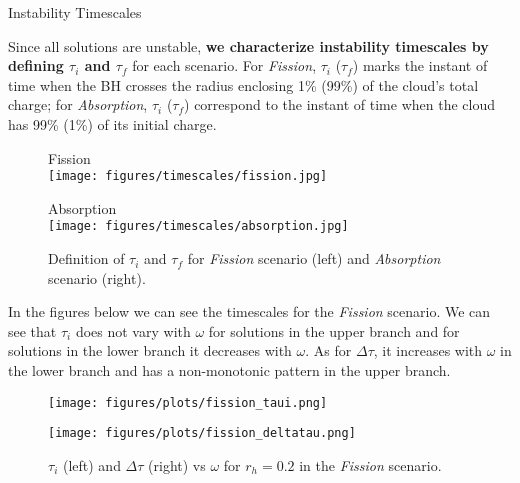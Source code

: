 \begin{block}{Instability Timescales}

Since all solutions are unstable, \textbf{we characterize instability timescales by defining $\tau_i$ and $\tau_f$} for each scenario. For \textit{Fission}, $\tau_i$ ($\tau_f$) marks the instant of time when the \gls{BH} crosses the radius enclosing 1\% (99\%) of the cloud's total charge; for \textit{Absorption}, $\tau_i$ ($\tau_f$) correspond to the instant of time when the cloud has 99\% (1\%) of its initial charge.

\begin{figure}[h!]
    \centering
    \begin{minipage}[b]{0.49\textwidth}
        \centering
        {\large \Raleway \textmd{Fission}} \\
        \vspace{0.75em}
        \texttt{[image: figures/timescales/fission.jpg]}
    \end{minipage}
    \hfill
    \begin{minipage}[b]{0.49\textwidth}
        \centering
        {\large \Raleway \textmd{Absorption}} \\
        \vspace{0.75em}
        \texttt{[image: figures/timescales/absorption.jpg]}
    \end{minipage}
    \caption{Definition of $\tau_i$ and $\tau_f$ for \textit{Fission} scenario (left) and \textit{Absorption} scenario (right).}
\end{figure}

In the figures below we can see the timescales for the \textit{Fission} scenario. We can see that $\tau_i$ does not vary with $\omega$ for solutions in the upper branch and for solutions in the lower branch it decreases with $\omega$. As for $\Delta \tau$, it increases with $\omega$ in the lower branch and has a non-monotonic pattern in the upper branch.

\begin{figure}[h!]
    \centering
    \begin{minipage}[b]{0.49\textwidth}
        \centering
        \texttt{[image: figures/plots/fission\_taui.png]}
    \end{minipage}
    \hfill
    \begin{minipage}[b]{0.49\textwidth}
        \centering
        \texttt{[image: figures/plots/fission\_deltatau.png]}
    \end{minipage}
    \caption{$\tau_i$ (left) and $\Delta \tau$ (right) vs $\omega$ for $r_h = 0.2$ in the \textit{Fission} scenario.}
\end{figure}


\end{block}
